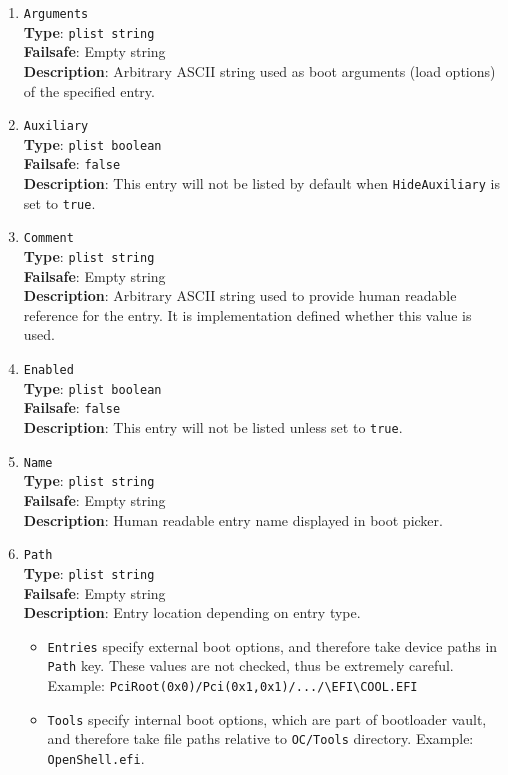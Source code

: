 \documentclass[]{article}
\providecommand{\tightlist}{%
  \setlength{\itemsep}{0pt}\setlength{\parskip}{0pt}}
\begin{document}
\begin{enumerate}
\item
  \texttt{Arguments}\\
  \textbf{Type}: \texttt{plist\ string}\\
  \textbf{Failsafe}: Empty string\\
  \textbf{Description}: Arbitrary ASCII string used as boot arguments (load options)
  of the specified entry.

\item
  \texttt{Auxiliary}\\
  \textbf{Type}: \texttt{plist\ boolean}\\
  \textbf{Failsafe}: \texttt{false}\\
  \textbf{Description}: This entry will not be listed by default when
  \texttt{HideAuxiliary} is set to \texttt{true}.

\item
  \texttt{Comment}\\
  \textbf{Type}: \texttt{plist\ string}\\
  \textbf{Failsafe}: Empty string\\
  \textbf{Description}: Arbitrary ASCII string used to provide human readable
  reference for the entry. It is implementation defined whether this value is
  used.

\item
  \texttt{Enabled}\\
  \textbf{Type}: \texttt{plist\ boolean}\\
  \textbf{Failsafe}: \texttt{false}\\
  \textbf{Description}: This entry will not be listed unless set to
  \texttt{true}.

\item
  \texttt{Name}\\
  \textbf{Type}: \texttt{plist\ string}\\
  \textbf{Failsafe}: Empty string\\
  \textbf{Description}: Human readable entry name displayed in boot picker.

\item
  \texttt{Path}\\
  \textbf{Type}: \texttt{plist\ string}\\
  \textbf{Failsafe}: Empty string\\
  \textbf{Description}: Entry location depending on entry type.

  \begin{itemize}
  \tightlist
  \item \texttt{Entries} specify external boot options, and therefore take device
  paths in \texttt{Path} key. These values are not checked, thus be extremely careful.
  Example: \texttt{PciRoot(0x0)/Pci(0x1,0x1)/.../\textbackslash EFI\textbackslash COOL.EFI}
  \item \texttt{Tools} specify internal boot options, which are part of bootloader
  vault, and therefore take file paths relative to \texttt{OC/Tools} directory.
  Example: \texttt{OpenShell.efi}.
  \end{itemize}


\end{enumerate}
\end{document}
